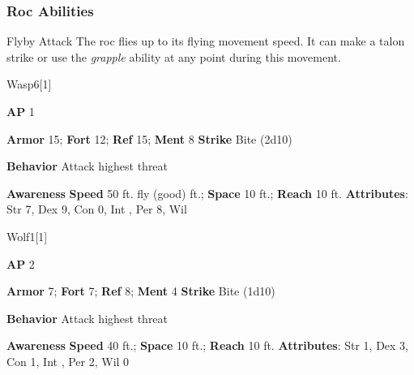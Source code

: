 \subsubsection{Roc Abilities}

\begin{ability}{Flyby Attack}
The roc flies up to its flying movement speed.
It can make a talon strike or use the \textit{grapple} ability at any point during this movement.
\end{ability}






\begin{monsection}[Giant]{Wasp}{6}[1]
\vspace{-1em}\vspace{-1em}
\begin{spellcontent}
\begin{spelltargetinginfo}
{\textbf{AP} 1}

\pari \textbf{Armor} 15;
\textbf{Fort} 12;
\textbf{Ref} 15;
\textbf{Ment} 8
\pari \textbf{Strike} Bite  (2d10)



\pari \textbf{Behavior} Attack highest threat
\end{spelltargetinginfo}
\end{spellcontent}

\begin{monsterfooter}
\pari \textbf{Awareness} 
\pari \textbf{Speed} 50 ft. fly (good) ft.;
\textbf{Space} 10 ft.;
\textbf{Reach} 10 ft.
\pari \textbf{Attributes}:
Str 7,
Dex 9,
Con 0,
Int ,
Per 8,
Wil 
\end{monsterfooter}
\end{monsection}





\begin{monsection}{Wolf}{1}[1]
\vspace{-1em}\vspace{-1em}
\begin{spellcontent}
\begin{spelltargetinginfo}
{\textbf{AP} 2}

\pari \textbf{Armor} 7;
\textbf{Fort} 7;
\textbf{Ref} 8;
\textbf{Ment} 4
\pari \textbf{Strike} Bite  (1d10)



\pari \textbf{Behavior} Attack highest threat
\end{spelltargetinginfo}
\end{spellcontent}

\begin{monsterfooter}
\pari \textbf{Awareness} 
\pari \textbf{Speed} 40 ft.;
\textbf{Space} 10 ft.;
\textbf{Reach} 10 ft.
\pari \textbf{Attributes}:
Str 1,
Dex 3,
Con 1,
Int ,
Per 2,
Wil 0
\end{monsterfooter}
\end{monsection}





